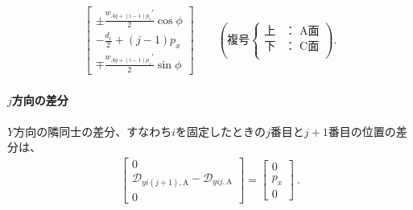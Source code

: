\begin{align*}
  \left[
  \begin{array}{c}
    \displaystyle \pm\frac{w_{Aq+(i-1)p_z}'}2\cos\phi\\[6pt]
    \displaystyle -\frac{d_i}2+(j-1)p_x\\[6pt]
    \displaystyle \mp\frac{w_{Aq+(i-1)p_z}'}2\sin\phi
  \end{array}
  \right]\qquad
  \left(
  \text{複号}
  \left\{
  \begin{array}{rl}
    \!\text{上}\!\!\!& \text{： A面}\\
    \!\text{下}\!\!\!& \text{： C面}\\
  \end{array}
  \right.
  \right).
\end{align*}





\paragraph{$j$方向の差分}\noindent
$Y$方向の隣同士の差分、すなわち$i$を固定したときの$j$番目と$j+1$番目の位置の差分は、
\begin{align*}
  \left[
  \begin{array}{c}
    0\\
    \mathcal D_{yi(j+1),\mathrm A}-\mathcal D_{yij,\mathrm A}\\
    0
  \end{array}
  \right]
  = \left[
    \begin{array}{c}
      0\\
      p_x\\
      0
    \end{array}
    \right]\ .
\end{align*}


